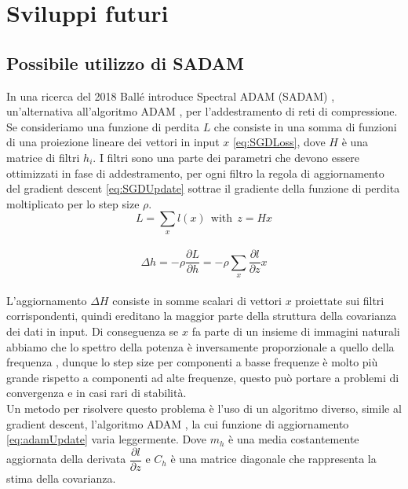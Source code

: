 \chapter{Sviluppi futuri}

\section{Possibile utilizzo di SADAM}

In una ricerca del 2018 Ballé introduce Spectral ADAM (SADAM) \cite{balle2018efficient}, un'alternativa all’algoritmo ADAM \cite{kingma2014adam}, per l’addestramento di reti di compressione.\\
Se consideriamo una funzione di perdita $L$ che consiste in una somma di funzioni di una proiezione lineare dei vettori in input $x$ \ref{eq:SGDLoss}, dove $H$ è una matrice di filtri $h_{i}$. I filtri sono una parte dei parametri che devono essere ottimizzati in fase di addestramento, per ogni filtro la regola di aggiornamento del gradient descent \ref{eq:SGDUpdate} sottrae il gradiente della funzione di perdita moltiplicato per lo step size $\rho$.\\
\begin{equation}\label{eq:SGDLoss}
L = \sum_{x} l(x) \:\: \textrm{with} \:\: z = Hx
\end{equation}\\
\begin{equation}\label{eq:SGDUpdate}
\Delta h = - \rho \dfrac{\partial L}{\partial h} = - \rho \sum_{x} \dfrac{\partial l}{\partial z} x
\end{equation}\\
L’aggiornamento $\Delta H$ consiste in somme scalari di vettori $x$ proiettate sui filtri corrispondenti, quindi ereditano la maggior parte della struttura della covarianza dei dati in input. Di conseguenza se $x$ fa parte di un insieme di immagini naturali abbiamo che lo spettro della potenza è inversamente proporzionale a quello della frequenza \cite{field1987relations}, dunque lo step size per componenti a basse frequenze è molto più grande rispetto a componenti ad alte frequenze, questo può portare a problemi di convergenza e in casi rari di stabilità.\\
Un metodo per risolvere questo problema è l’uso di un algoritmo diverso, simile al gradient descent, l’algoritmo ADAM \cite{kingma2014adam}, la cui funzione di aggiornamento \ref{eq:adamUpdate} varia leggermente. Dove $m_{h}$ è una media costantemente aggiornata della derivata $\dfrac{\partial l}{\partial z}$ e $C_{h}$ è una matrice diagonale che rappresenta la stima della covarianza.\\
